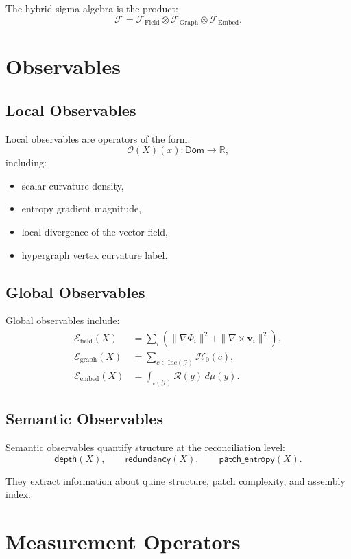 The hybrid sigma-algebra is the product:
\[
\mathcal{F} = \mathcal{F}_{\mathrm{Field}}
  \otimes \mathcal{F}_{\mathrm{Graph}}
  \otimes \mathcal{F}_{\mathrm{Embed}}.
\]

\section{Observables}

\subsection{Local Observables}

Local observables are operators of the form:
\[
\mathcal{O}(X)(x) : \mathsf{Dom} \to \mathbb{R},
\]
including:
\begin{itemize}
\item scalar curvature density,
\item entropy gradient magnitude,
\item local divergence of the vector field,
\item hypergraph vertex curvature label.
\end{itemize}

\subsection{Global Observables}

Global observables include:
\begin{align*}
\mathcal{E}_{\mathrm{field}}(X) &= \sum_i \left( \|\nabla \Phi_i\|^2 + \|\nabla \times \mathbf{v}_i\|^2 \right), \\
\mathcal{E}_{\mathrm{graph}}(X) &= \sum_{c \in \mathrm{Inc}(\mathcal{G})} \mathcal{H}_0(c), \\
\mathcal{E}_{\mathrm{embed}}(X) &= \int_{\iota(\mathcal{G})} \mathcal{R}(y) \, d\mu(y).
\end{align*}

\subsection{Semantic Observables}

Semantic observables quantify structure at the reconciliation level:
\[
\mathsf{depth}(X), \qquad 
\mathsf{redundancy}(X), \qquad
\mathsf{patch\_entropy}(X).
\]

They extract information about quine structure, patch complexity, and assembly index.

\section{Measurement Operators}

